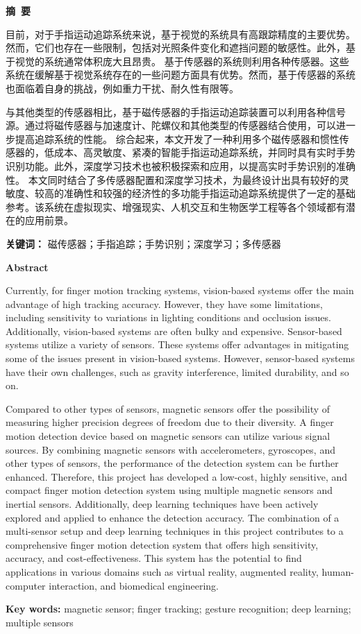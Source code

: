 \cleardoublepage{}
\begin{center}
    \bfseries {} 摘~要
\end{center}

目前，对于手指运动追踪系统来说，基于视觉的系统具有高跟踪精度的主要优势。然而，它们也存在一些限制，包括对光照条件变化和遮挡问题的敏感性。此外，基于视觉的系统通常体积庞大且昂贵。
基于传感器的系统则利用各种传感器。这些系统在缓解基于视觉系统存在的一些问题方面具有优势。然而，基于传感器的系统也面临着自身的挑战，例如重力干扰、耐久性有限等。

与其他类型的传感器相比，基于磁传感器的手指运动追踪装置可以利用各种信号源。通过将磁传感器与加速度计、陀螺仪和其他类型的传感器结合使用，可以进一步提高追踪系统的性能。
综合起来，本文开发了一种利用多个磁传感器和惯性传感器的，低成本、高灵敏度、紧凑的智能手指运动追踪系统，并同时具有实时手势识别功能。此外，深度学习技术也被积极探索和应用，以提高实时手势识别的准确性。
本文同时结合了多传感器配置和深度学习技术，为最终设计出具有较好的灵敏度、较高的准确性和较强的经济性的多功能手指运动追踪系统提供了一定的基础参考。该系统在虚拟现实、增强现实、人机交互和生物医学工程等各个领域都有潜在的应用前景。

{\noindent \textbf{关键词：} 磁传感器；手指追踪；手势识别；深度学习；多传感器}

\cleardoublepage{}
\begin{center}
    \bfseries {} Abstract
\end{center}

Currently, for finger motion tracking systems, vision-based systems offer the main advantage of high tracking accuracy. However, they have some limitations, including sensitivity to variations in lighting conditions and occlusion issues. 
Additionally, vision-based systems are often bulky and expensive.
Sensor-based systems utilize a variety of sensors. These systems offer advantages in mitigating some of the issues present in vision-based systems.
However, sensor-based systems have their own challenges, such as gravity interference, limited durability, and so on.

Compared to other types of sensors, magnetic sensors offer the possibility of measuring higher precision degrees of freedom due to their diversity. A finger motion detection device based on magnetic sensors can utilize various signal sources.
By combining magnetic sensors with accelerometers, gyroscopes, and other types of sensors, the performance of the detection system can be further enhanced.
Therefore, this project has developed a low-cost, highly sensitive, and compact finger motion detection system using multiple magnetic sensors and inertial sensors. Additionally, deep learning techniques have been actively explored and applied to enhance the detection accuracy.
The combination of a multi-sensor setup and deep learning techniques in this project contributes to a comprehensive finger motion detection system that offers high sensitivity, accuracy, and cost-effectiveness. This system has the potential to find applications in various domains such as virtual reality, augmented reality, human-computer interaction, and biomedical engineering.

{\noindent \textbf{Key words:} magnetic sensor; finger tracking; gesture recognition; deep learning; multiple sensors}
